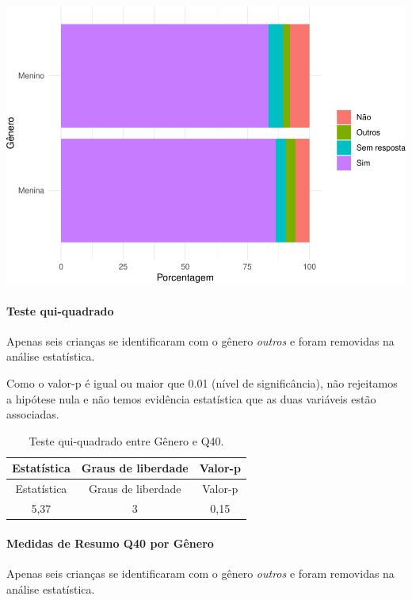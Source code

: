 \documentclass[]{article}
\let\oldparagraph\paragraph
\renewcommand{\paragraph}[1]{\oldparagraph{#1}\mbox{}}
\begin{document}
\begin{center}\includegraphics[width=0.75\linewidth]{relatorio_covid19_files/figure-latex/unnamed-chunk-1557-1} \end{center}

\hypertarget{teste-qui-quadrado-133}{%
\paragraph{Teste qui-quadrado}\label{teste-qui-quadrado-133}}

Apenas seis crianças se identificaram com o gênero \emph{outros} e foram removidas na análise estatística.

Como o valor-p é igual ou maior que 0.01 (nível de significância), não rejeitamos a hipótese nula e não temos evidência estatística que as duas variáveis estão associadas.

\begin{longtable}[]{@{}ccc@{}}
\caption{\label{tab:unnamed-chunk-1559}Teste qui-quadrado entre Gênero e Q40.}\tabularnewline
\toprule
Estatística & Graus de liberdade & Valor-p\tabularnewline
\midrule
\endfirsthead
\toprule
Estatística & Graus de liberdade & Valor-p\tabularnewline
\midrule
\endhead
5,37 & 3 & 0,15\tabularnewline
\bottomrule
\end{longtable}

\cleardoublepage

\hypertarget{medidas-de-resumo-q40-por-guxeanero}{%
\paragraph{Medidas de Resumo Q40 por Gênero}\label{medidas-de-resumo-q40-por-guxeanero}}

Apenas seis crianças se identificaram com o gênero \emph{outros} e foram removidas na análise estatística.
\end{document}
